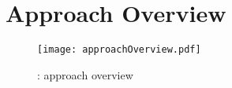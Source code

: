 \section{Approach Overview}
\label{sec:approach}



\begin{figure}[t]
\centering
\texttt{[image: approachOverview.pdf]}
\caption{\name: approach overview}
\label{fig:approachOverview}
\centering
\end{figure}
